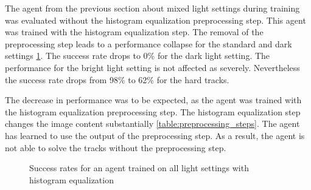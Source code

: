 The agent from the previous section about mixed light settings during training was evaluated without the histogram equalization preprocessing step. This agent was trained with the histogram equalization step. The removal of the preprocessing step leads to a performance collapse for the standard and dark settings \ref{fig:hardDistance_mixedLight_comparison_withWithoutHistogramEqualization}. The success rate drops to 0\% for the dark light setting.
The performance for the bright light setting is not affected as severely. Nevertheless the success rate drops from 98\% to 62\% for the hard tracks. 

The decrease in performance was to be expected, as the agent was trained with the histogram equalization preprocessing step. The histogram equalization step changes the image content substantially \ref{table:preprocessing_steps}. The agent has learned to use the output of the preprocessing step. As a result, the agent is not able to solve the tracks without the preprocessing step.

\begin{figure}
    \centering
    \caption{Success rates for an agent trained on all light settings with histogram equalization}
    \label{fig:hardDistance_mixedLight_comparison_withWithoutHistogramEqualization}
\end{figure}


